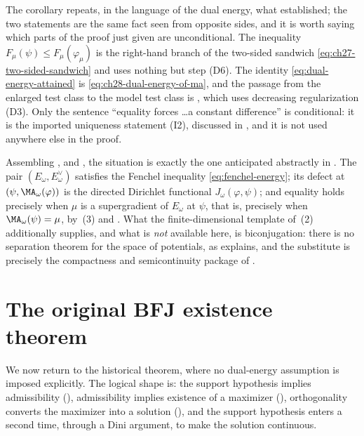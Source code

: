 The corollary repeats, in the language of the dual energy, what
 established; the two statements are the
same fact seen from opposite sides, and it is worth saying which parts of
the proof just given are unconditional.  The inequality
$F_\mu(\psi)\leq F_\mu(\varphi_\mu)$ is the right-hand branch of the
two-sided sandwich \eqref{eq:ch27-two-sided-sandwich} and uses nothing but
step \textup{(D6)}.  The identity \eqref{eq:dual-energy-attained} is
\eqref{eq:ch28-dual-energy-of-ma}, and the passage from the enlarged test
class to the model test class is , which uses
decreasing regularization \textup{(D3)}.  Only the sentence
``equality forces \dots a constant difference'' is conditional: it is the
imported uniqueness statement \textup{(I2)}, discussed in
, and it is not used anywhere else in the proof.

\begin{remark}
\label{rem:ch28-fenchel-picture}
Assembling ,
 and
, the situation is
exactly the one anticipated abstractly in .
The pair $(E_\omega,E^\vee_\omega)$ satisfies the Fenchel inequality
\eqref{eq:fenchel-energy}; its defect at $(\psi,\MA_\omega(\varphi))$ is
the directed Dirichlet functional $J_\omega(\varphi,\psi)$; and equality
holds precisely when $\mu$ is a supergradient of $E_\omega$ at
$\psi$, that is, precisely when $\MA_\omega(\psi)=\mu$, by
\,(3) and
.  What the finite-dimensional
template of \,(2) additionally supplies,
and what is \emph{not} available here, is biconjugation: there is no
separation theorem for the space of potentials, as
 explains, and the substitute is
precisely the compactness and semicontinuity package of
.
\end{remark}

\section{The original BFJ existence theorem}
\label{sec:ch28-bfj-theorem}

We now return to the historical theorem, where no dual-energy assumption is
imposed explicitly.  The logical shape is: the support hypothesis implies
admissibility (), admissibility implies
existence of a maximizer (),
orthogonality converts the maximizer into a solution
(), and the support hypothesis
enters a second time, through a Dini argument, to make the solution
continuous.

